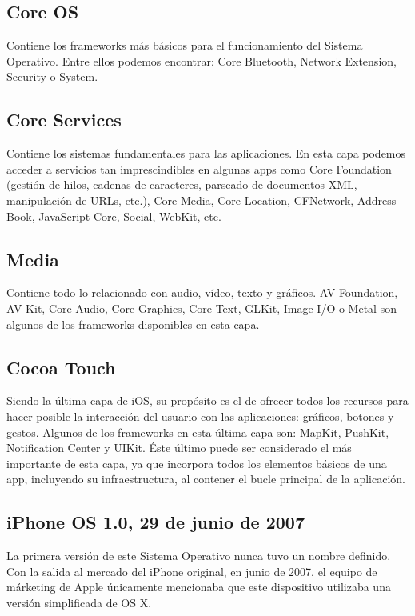 \subsection*{Core OS}
Contiene los frameworks más básicos para el funcionamiento del Sistema Operativo. Entre ellos podemos encontrar: Core Bluetooth, Network Extension, Security o System.

\subsection*{Core Services}
Contiene los sistemas fundamentales para las aplicaciones. En esta capa podemos acceder a servicios tan imprescindibles en algunas apps como Core Foundation (gestión de hilos, cadenas de caracteres, parseado de documentos XML, manipulación de URLs, etc.), Core Media, Core Location, CFNetwork, Address Book, JavaScript Core, Social, WebKit, etc.

\subsection*{Media}
Contiene todo lo relacionado con audio, vídeo, texto y gráficos. AV Foundation, AV Kit, Core Audio, Core Graphics, Core Text, GLKit, Image I/O o Metal son algunos de los frameworks disponibles en esta capa.

\subsection*{Cocoa Touch}
Siendo la última capa de iOS, su propósito es el de ofrecer todos los recursos para hacer posible la interacción del usuario con las aplicaciones: gráficos, botones y gestos. Algunos de los frameworks en esta última capa son: MapKit, PushKit, Notification Center y UIKit. Éste último puede ser considerado el más importante de esta capa, ya que incorpora todos los elementos básicos de una app, incluyendo su infraestructura, al contener el bucle principal de la aplicación.

\subsection{iPhone OS 1.0, 29 de junio de 2007}
La primera versión de este Sistema Operativo nunca tuvo un nombre definido. Con la salida al mercado del iPhone original, en junio de 2007, el equipo de márketing de Apple únicamente mencionaba que este dispositivo utilizaba una versión simplificada de OS X.


